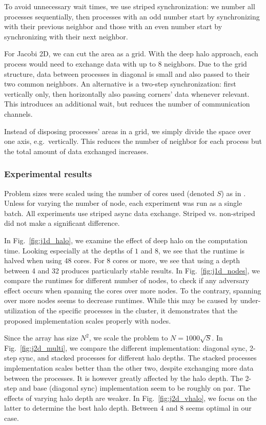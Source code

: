  To avoid unnecessary wait times, we use striped synchronization: we number all processes sequentially, then processes with an odd number start by synchronizing with their previous neighbor and those with an even number start by synchronizing with their next neighbor.

For Jacobi 2D, we can cut the area as a grid.
With the deep halo approach, each process would need to exchange data with up to 8 neighbors.
Due to the grid structure, data between processes in diagonal is small and also passed to their two common neighbors.
An alternative is a two-step synchronization: first vertically only, then horizontally also passing corners' data whenever relevant.
This introduces an additional wait, but reduces the number of communication channels.

Instead of disposing processes' areas in a grid, we simply divide the space over one axis, e.g.~vertically.
This reduces the number of neighbor for each process but the total amount of data exchanged increases.


\subsubsection{Experimental results}\label{jacobi_mpi_results}
Problem sizes were scaled using the number of cores used (denoted $S$) as in \cite{data-centric-python}.
Unless for varying the number of node, each experiment was run as a single batch.
All experiments use striped async data exchange.
Striped vs. non-striped did not make a significant difference.

In Fig.~\ref{fig:j1d_halo}, we examine the effect of deep halo on the computation time.
Looking especially at the depths of $1$ and $8$, we see that the runtime is halved when using 48 cores.
For 8 cores or more, we see that using a depth between 4 and 32 produces particularly stable results.
In Fig.~\ref{fig:j1d_nodes}, we compare the runtimes for different number of nodes, to check if any adversary effect occurs when spanning the cores over more nodes.
To the contrary, spanning over more nodes seems to decrease runtimes.
While this may be caused by under-utilization of the specific processes in the cluster, it demonstrates that the proposed implementation scales properly with nodes.

Since the array has size $N^2$, we scale the problem to $N=1000\sqrt S$.
In Fig.~\ref{fig:j2d_multi}, we compare the different implementation: diagonal sync, 2-step sync, and stacked processes for different halo depths.
The stacked processes implementation scales better than the other two, despite exchanging more data between the processes.
It is however greatly affected by the halo depth.
The 2-step and base (diagonal sync) implementation seem to be roughly on par.
The effects of varying halo depth are weaker.
In Fig.~\ref{fig:j2d_vhalo}, we focus on the latter to determine the best halo depth.
Between 4 and 8 seems optimal in our case.